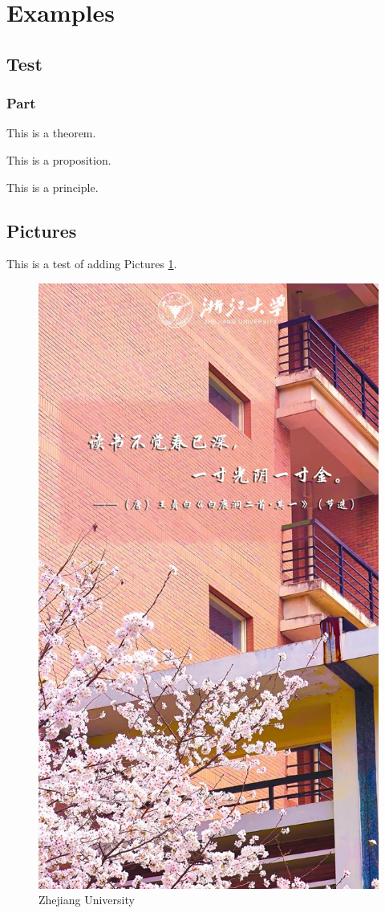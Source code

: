 \documentclass{article}
\begin{document}

\tableofcontents
\newpage


\section{Examples}

\subsection{Test}

\subsubsection{Part}

\begin{theorem}
    This is a theorem.
\end{theorem}

\begin{proposition}
    This is a proposition.
\end{proposition}

\begin{principle}
    This is a principle.
\end{principle}

\subsection{Pictures}

This is a test of adding Pictures \ref{fig.photo}.

\begin{figure}[htbp]
    \center
    \includegraphics[width=0.4\linewidth]{fig/photo.jpg}
    \caption{Zhejiang University}
	\label{fig.photo}
\end{figure}
\end{document}
